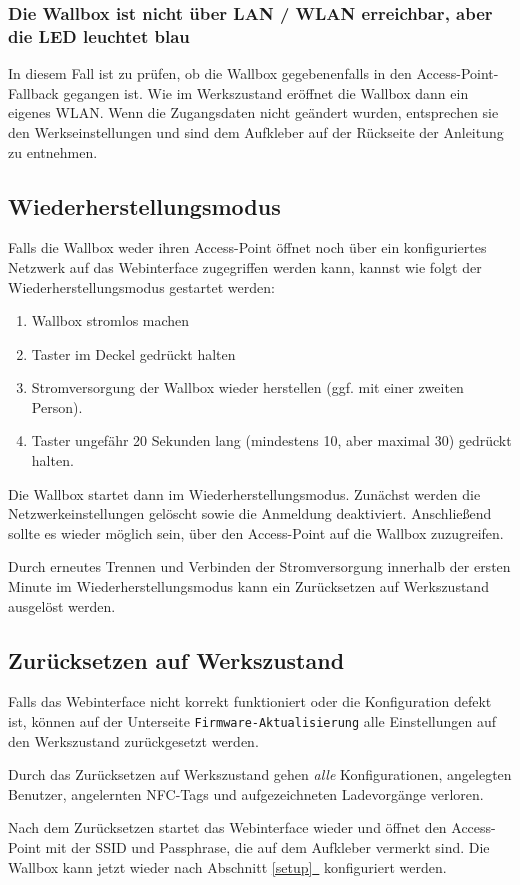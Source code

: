 \documentclass[a4paper,10pt]{article}
\newcommand{\hint}[1]{\begin{tcolorbox}[colback=boxgray,colframe=black,coltext=
white,title=Hinweis,left*=2mm,right*=2mm,boxsep=1mm,bottom=1mm,top=1mm]#1\end{tcolorbox}}
\newcommand*{\fullref}[1]{Abschnitt \hyperref[{#1}]{\ref*{#1}~\nameref*{#1}}}
\begin{document}
\begin{multicols*}{2}
    \subsubsection*{Die Wallbox ist nicht über LAN / WLAN erreichbar, aber die
	LED leuchtet blau}
    In diesem Fall ist zu prüfen, ob die Wallbox gegebenenfalls in den Access-Point-Fallback
    gegangen ist. Wie im Werkszustand eröffnet die Wallbox dann ein eigenes
    WLAN. Wenn die Zugangsdaten nicht geändert wurden, entsprechen sie den Werkseinstellungen und sind dem
    Aufkleber auf der Rückseite der Anleitung zu entnehmen.


    \subsection{Wiederherstellungsmodus}\label{recovery}
    Falls die Wallbox weder ihren Access-Point öffnet noch über ein konfiguriertes Netzwerk auf das Webinterface zugegriffen werden kann,
    kannst wie folgt der Wiederherstellungsmodus gestartet werden:
    \begin{enumerate}
     \item Wallbox stromlos machen
     \item Taster im Deckel gedrückt halten
     \item Stromversorgung der Wallbox wieder herstellen (ggf. mit einer zweiten Person).
     \item Taster ungefähr 20 Sekunden lang (mindestens 10, aber maximal 30) gedrückt halten.
    \end{enumerate}
    Die Wallbox startet dann im Wiederherstellungsmodus. Zunächst werden die Netzwerkeinstellungen gelöscht sowie die Anmeldung deaktiviert.
    Anschließend sollte es wieder möglich sein, über den Access-Point auf die Wallbox zuzugreifen.

    Durch erneutes Trennen und Verbinden der Stromversorgung innerhalb der ersten Minute im Wiederherstellungsmodus kann ein Zurücksetzen auf Werkszustand ausgelöst werden.

    \subsection{Zurücksetzen auf Werkszustand}\label{reset}
    Falls das Webinterface nicht korrekt funktioniert oder die Konfiguration defekt ist,
    können auf der Unterseite \texttt{Firmware-Aktualisierung} alle Einstellungen auf den Werkszustand zurückgesetzt werden.
    \hint{Durch das Zurücksetzen auf Werkszustand gehen \textit{alle} Konfigurationen, angelegten Benutzer, angelernten NFC-Tags und aufgezeichneten Ladevorgänge verloren.}
    Nach dem Zurücksetzen startet das Webinterface wieder und öffnet
    den Access-Point mit der SSID und Passphrase, die auf dem Aufkleber vermerkt
    sind. Die Wallbox kann jetzt wieder nach \fullref{setup} konfiguriert werden.


\end{multicols*}
\end{document}
